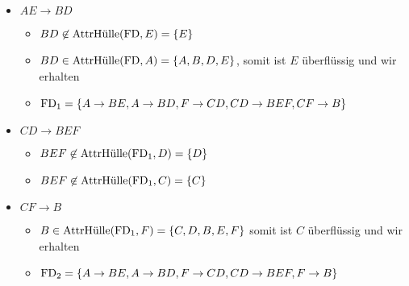 \documentclass[main.tex]{subfiles}
\begin{document}
\begin{itemize}
    \item $AE\to BD$
    \begin{itemize}
        \item $BD \not\in \text{AttrHülle}(\text{FD}, E) = \{E\}$
        \item $BD \in \text{AttrHülle}(\text{FD}, A) = \{A, B, D, E\}$, somit ist $E$ überflüssig und wir erhalten
        \item $\text{FD}_1=\{A\to BE, A\to BD, F\to CD, CD\to BEF, CF\to B\}$
    \end{itemize}
    \item $CD\to BEF$
    \begin{itemize}
        \item $BEF \not\in \text{AttrHülle}(\text{FD}_1, D) = \{D\}$
        \item $BEF \not\in \text{AttrHülle}(\text{FD}_1, C) = \{C\}$
    \end{itemize}
    \item $CF\to B$
    \begin{itemize}
        \item $B \in \text{AttrHülle}(\text{FD}_1, F) = \{C, D, B, E, F\}$ somit ist $C$ überflüssig und wir erhalten
        \item $\text{FD}_2=\{A\to BE, A\to BD, F\to CD, CD\to BEF, F\to B\}$
    \end{itemize}
\end{itemize}
\end{document}
